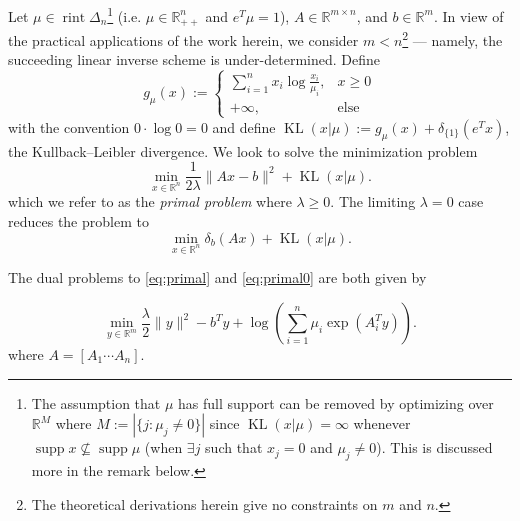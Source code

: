 \documentclass[10pt,a4paper]{article}
\numberwithin{equation}{section}
\theoremstyle{definition}
\def\rr{{\mathbb R}}
\DeclareMathOperator{\rint}{rint}
\DeclareMathOperator{\supp}{supp}
\DeclareMathOperator{\KL}{KL}
\begin{document}
Let $\mu \in \rint \Delta_n$\footnote{The assumption that $\mu$ has full support can be removed by optimizing over $\rr^M$ where $M:= |\{j: \mu_j \neq 0\}|$ since $\KL(x|\mu) = \infty$ whenever $\supp x \nsubseteq \supp \mu$ (when $\exists j$ such that $x_j = 0$ and $\mu_j \neq 0$). This is discussed more in the remark below.} (i.e. $\mu \in \rr^n_{++}$ and $e^T\mu = 1$), $A \in \rr^{m \times n}$, and $b \in \rr^m$. In view of the practical applications of the work herein, we consider $m < n$\footnote{The theoretical derivations herein give no constraints on $m$ and $n$.} --- namely, the succeeding linear inverse scheme is under-determined. Define 
\[
g_\mu(x) := \begin{cases}
			\sum_{i=1}^n x_i \log\frac{x_i}{\mu_i}, & x \geq 0 \\
            + \infty, & \text{else}
		 \end{cases}
\]
with the convention $0 \cdot \log 0 = 0$ and define $\KL(x| \mu):= g_\mu(x) + \delta_{\{1\}}(e^Tx)$, the Kullback--Leibler divergence. We look to solve the minimization problem
\begin{equation}\label{eq:primal}
   \min_{x \in \rr^n} \frac{1}{2 \lambda} \lVert Ax - b \rVert^2 + \KL(x| \mu).
\end{equation}
which we refer to as the \emph{primal problem} where $\lambda \geq 0$. The limiting $\lambda = 0$ case reduces the problem to
\begin{equation}\label{eq:primal0}
   \min_{x \in \rr^n} \delta_{b}(Ax) + \KL(x| \mu).
\end{equation}

The dual problems to \eqref{eq:primal} and \eqref{eq:primal0} are both given by 

\begin{equation}\label{eq:dual}
    \min_{y \in \rr^m} \frac{\lambda}{2} \lVert y \rVert^2 - b^Ty +  \log \left(\sum_{i=1}^n \mu_i \exp(A_i^T y)\right).
\end{equation}
where $A = [A_1 \cdots A_n]$.
\end{document}
